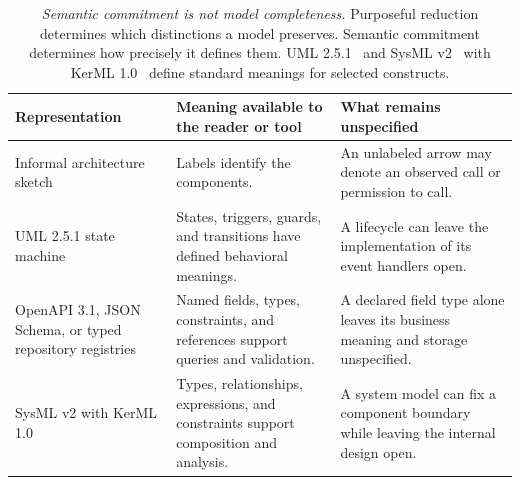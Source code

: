{\footnotesize
\begin{longtable}[]{@{}
  >{\raggedright\arraybackslash}p{}
  >{\raggedright\arraybackslash}p{}
  >{\raggedright\arraybackslash}p{}@{}}
\caption[Degrees of semantic commitment, in concrete artifacts]{\emph{Semantic commitment is not model completeness.} Purposeful reduction determines which distinctions a model preserves. Semantic commitment determines how precisely it defines them. UML 2.5.1~\citep{omg2017uml} and SysML v2~\citep{omg2025sysml} with KerML 1.0~\citep{omg2025kerml} define standard meanings for selected constructs.}\label{semantic-commitment-spectrum}\tabularnewline
\toprule\noalign{}
Representation & Meaning available to the reader or tool & What remains unspecified \\
\midrule\noalign{}
\endhead
\bottomrule\noalign{}
\endlastfoot
Informal architecture sketch & Labels identify the components. & An unlabeled arrow may denote an observed call or permission to call. \\
UML 2.5.1 state machine & States, triggers, guards, and transitions have defined behavioral meanings. & A lifecycle can leave the implementation of its event handlers open. \\
OpenAPI 3.1, JSON Schema, or typed repository registries & Named fields, types, constraints, and references support queries and validation. & A declared field type alone leaves its business meaning and storage unspecified. \\
SysML v2 with KerML 1.0 & Types, relationships, expressions, and constraints support composition and analysis. & A system model can fix a component boundary while leaving the internal design open. \\
\end{longtable}
}





